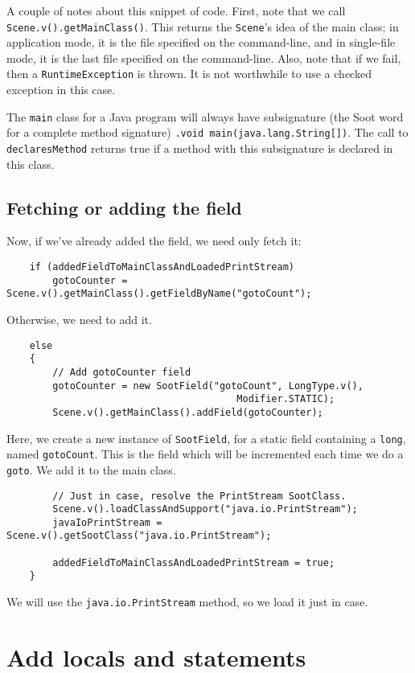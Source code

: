 \documentclass{article}
\begin{document}
A couple of notes about this snippet of code.  First, note that we
call {\tt Scene.v().getMainClass()}.  This returns the {\tt Scene}'s
idea of the main class; in application mode, it is the file specified
on the command-line, and in single-file mode, it is the last file
specified on the command-line.  Also, note that if we fail, then
a {\tt RuntimeException} is thrown.  It is not worthwhile to use a checked
exception in this case.

The {\tt main} class for a Java program will always have subsignature
(the Soot word for a complete method signature) {\tt .void
main(java.lang.String[])}. The call to {\tt declaresMethod} 
returns true if a method with this subsignature is declared in this
class.

\subsection{Fetching or adding the field}

Now, if we've already added the field, we need only fetch it:
\begin{verbatim}
    if (addedFieldToMainClassAndLoadedPrintStream)
        gotoCounter = Scene.v().getMainClass().getFieldByName("gotoCount");
\end{verbatim}

Otherwise, we need to add it.
\begin{verbatim}
    else
    {
        // Add gotoCounter field
        gotoCounter = new SootField("gotoCount", LongType.v(), 
                                        Modifier.STATIC);
        Scene.v().getMainClass().addField(gotoCounter);
\end{verbatim}

Here, we create a new instance of {\tt SootField}, for a static field
containing a {\tt long}, named {\tt gotoCount}.  This is the field
which will be incremented each time we do a {\tt goto}.  We add it to
the main class.

\begin{verbatim}
        // Just in case, resolve the PrintStream SootClass.
        Scene.v().loadClassAndSupport("java.io.PrintStream");
        javaIoPrintStream = Scene.v().getSootClass("java.io.PrintStream");
    
        addedFieldToMainClassAndLoadedPrintStream = true;
    }
\end{verbatim}
We will use the {\tt java.io.PrintStream} method, so we load it just
in case.

\section{Add locals and statements}
\end{document}

